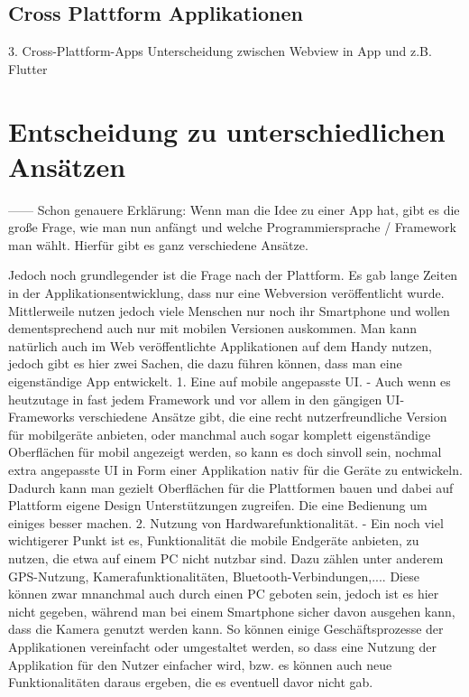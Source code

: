 \subsection{Cross Plattform Applikationen}
3. Cross-Plattform-Apps
Unterscheidung zwischen Webview in App und z.B. Flutter 

\section{Entscheidung zu unterschiedlichen Ansätzen}

------
Schon genauere Erklärung:
Wenn man die Idee zu einer App hat, gibt es die große Frage, wie man nun anfängt und welche Programmiersprache / Framework man wählt. Hierfür gibt es ganz verschiedene Ansätze.  

Jedoch noch grundlegender ist die Frage nach der Plattform. Es gab lange Zeiten in der Applikationsentwicklung, dass nur eine Webversion veröffentlicht wurde. Mittlerweile nutzen jedoch viele Menschen nur noch ihr Smartphone und wollen dementsprechend auch nur mit mobilen Versionen auskommen. Man kann natürlich auch im Web veröffentlichte Applikationen auf dem Handy nutzen, jedoch gibt es hier zwei Sachen, die dazu führen können, dass man eine eigenständige App entwickelt.
1. Eine auf mobile angepasste UI. - Auch wenn es heutzutage in fast jedem Framework und vor allem in den gängigen UI-Frameworks verschiedene Ansätze gibt, die eine recht nutzerfreundliche Version für mobilgeräte anbieten, oder manchmal auch sogar komplett eigenständige Oberflächen für mobil angezeigt werden, so kann es doch sinvoll sein, nochmal extra angepasste UI in Form einer Applikation nativ für die Geräte zu entwickeln. Dadurch kann man gezielt Oberflächen für die Plattformen bauen und dabei auf Plattform eigene Design Unterstützungen zugreifen. Die eine Bedienung um einiges besser machen.
2. Nutzung von Hardwarefunktionalität. -  Ein noch viel wichtigerer Punkt ist es, Funktionalität die mobile Endgeräte anbieten, zu nutzen, die etwa auf einem PC nicht nutzbar sind. Dazu zählen unter anderem GPS-Nutzung, Kamerafunktionalitäten, Bluetooth-Verbindungen,.... Diese können zwar mnanchmal auch durch einen PC geboten sein, jedoch ist es hier nicht gegeben, während man bei einem Smartphone sicher davon ausgehen kann, dass die Kamera genutzt werden kann. So können einige Geschäftsprozesse der Applikationen vereinfacht oder umgestaltet werden, so dass eine Nutzung der Applikation für den Nutzer einfacher wird, bzw. es können auch neue Funktionalitäten daraus ergeben, die es eventuell davor nicht gab.

